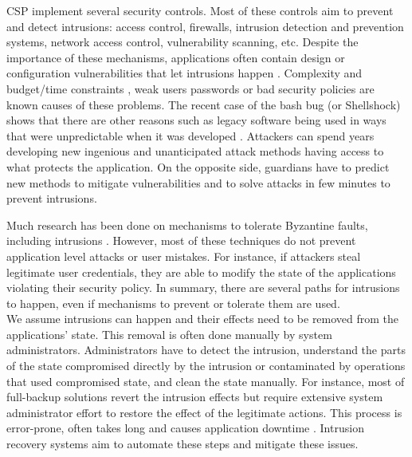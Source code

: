 \acf{CSP} implement several security controls. Most of these controls aim to prevent and detect intrusions: access control, firewalls, intrusion detection and prevention systems, network access control, vulnerability scanning, etc. Despite the importance of these mechanisms, applications often contain design or configuration vulnerabilities that let intrusions happen \cite{Williams2013,Hubbard2010}. Complexity and budget/time constraints \cite{Charette2005}, weak users passwords or bad security policies are known causes of these problems. The recent case of the bash bug (or Shellshock) shows that there are other reasons such as legacy software being used in ways that were unpredictable when it was developed \cite{Sidhpurwala:14}. Attackers can spend years developing new ingenious and unanticipated attack methods having access to what protects the application. On the opposite side, guardians have to predict new methods to mitigate vulnerabilities and to solve attacks in few minutes to prevent intrusions.

Much research has been done on mechanisms to tolerate Byzantine faults, including intrusions \cite{Castro2002,Verissimo2003,Gupta:03}. However, most of these techniques do not prevent application level attacks or user mistakes. For instance, if attackers steal legitimate user credentials, they are able to modify the state of the applications violating their security policy. In summary, there are several paths for intrusions to happen, even if mechanisms to prevent or tolerate them are used.\\ %

We assume intrusions can happen and their effects need to be removed from the applications' state. This removal is often done manually by system administrators. Administrators have to detect the intrusion, understand the parts of the state compromised directly by the intrusion or contaminated by operations that used compromised state, and clean the state manually. For instance, most of full-backup solutions revert the intrusion effects but require extensive system administrator effort to restore the effect of the legitimate actions. This process is error-prone, often takes long and causes application downtime \cite{Brown2001}. Intrusion recovery systems aim to automate these steps and mitigate these issues.

